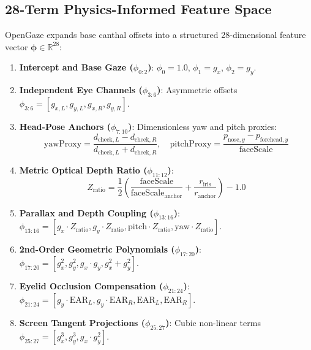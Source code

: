 \documentclass[10pt,twocolumn]{article}
\begin{document}
\subsection{28-Term Physics-Informed Feature Space}
\label{subsec:features28}
OpenGaze expands base canthal offsets into a structured 28-dimensional feature vector $\boldsymbol{\phi} \in \mathbb{R}^{28}$:
\begin{enumerate}[leftmargin=*]
    \item \textbf{Intercept and Base Gaze ($\phi_{0:2}$)}: $\phi_0 = 1.0$, $\phi_1 = g_x$, $\phi_2 = g_y$.
    \item \textbf{Independent Eye Channels ($\phi_{3:6}$)}: Asymmetric offsets $\phi_{3:6} = [g_{x,L}, g_{y,L}, g_{x,R}, g_{y,R}]$.
    \item \textbf{Head-Pose Anchors ($\phi_{7:10}$)}: Dimensionless yaw and pitch proxies:
    \begin{equation}
        \text{yawProxy} = \frac{d_{\text{cheek},L} - d_{\text{cheek},R}}{d_{\text{cheek},L} + d_{\text{cheek},R}}, \quad \text{pitchProxy} = \frac{p_{\text{nose},y} - p_{\text{forehead},y}}{\text{faceScale}}
    \end{equation}
    \item \textbf{Metric Optical Depth Ratio ($\phi_{11:12}$)}:
    \begin{equation}
        Z_{\text{ratio}} = \frac{1}{2} \left(\frac{\text{faceScale}}{\text{faceScale}_{\text{anchor}}} + \frac{r_{\text{iris}}}{r_{\text{anchor}}}\right) - 1.0
    \end{equation}
    \item \textbf{Parallax and Depth Coupling ($\phi_{13:16}$)}: $\phi_{13:16} = [g_x \cdot Z_{\text{ratio}}, g_y \cdot Z_{\text{ratio}}, \text{pitch} \cdot Z_{\text{ratio}}, \text{yaw} \cdot Z_{\text{ratio}}]$.
    \item \textbf{2nd-Order Geometric Polynomials ($\phi_{17:20}$)}: $\phi_{17:20} = [g_x^2, g_y^2, g_x \cdot g_y, g_x^2 + g_y^2]$.
    \item \textbf{Eyelid Occlusion Compensation ($\phi_{21:24}$)}: $\phi_{21:24} = [g_y \cdot \text{EAR}_L, g_y \cdot \text{EAR}_R, \text{EAR}_L, \text{EAR}_R]$.
    \item \textbf{Screen Tangent Projections ($\phi_{25:27}$)}: Cubic non-linear terms $\phi_{25:27} = [g_x^3, g_y^3, g_x \cdot g_y^2]$.
\end{enumerate}
\end{document}
